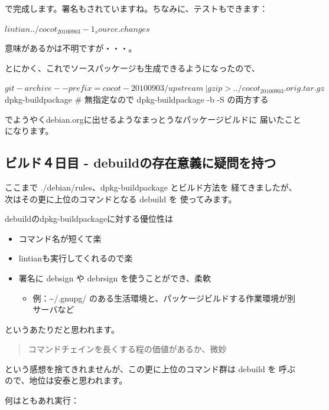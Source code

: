 \documentclass[mingoth,a4paper]{jsarticle}
\begin{document}
で完成します。署名もされていますね。ちなみに、テストもできます：

\begin{commandline}
$ lintian ../cocot_20100903-1_source.changes
$
\end{commandline}

意味があるかは不明ですが・・・。

とにかく、これでソースパッケージも生成できるようになったので、

\begin{commandline}
$ git-archive --prefix=cocot-20100903/ upstream \
| gzip > ../cocot_20100903.orig.tar.gz
$ dpkg-buildpackage  # 無指定なので dpkg-buildpackage -b -S の両方する
\end{commandline}

でようやくdebian.orgに出せるようなまっとうなパッケージビルドに
届いたことになります。

\subsection{ビルド４日目 - debuildの存在意義に疑問を持つ}

ここまで ./debian/rules、dpkg-buildpackage とビルド方法を
経てきましたが、次はその更に上位のコマンドとなる debuild を
使ってみます。

debuildのdpkg-buildpackageに対する優位性は

\begin{itemize}
\item コマンド名が短くて楽
\item lintianも実行してくれるので楽
\item 署名に debsign や debrsign を使うことができ、柔軟
\begin{itemize}
\item 例：\~{}/.gnupg/ のある生活環境と、パッケージビルドする作業環境が別サーバなど
\end{itemize}
\end{itemize}

というあたりだと思われます。

\begin{quote}
\Large{コマンドチェインを長くする程の価値があるか、微妙}
\end{quote}

という感想を捨てきれませんが、この更に上位のコマンド群は debuild を
呼ぶので、地位は安泰と思われます。

何はともあれ実行：
\end{document}
